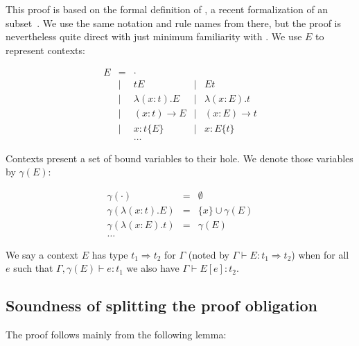 This proof is based on the formal definition of \emf, a recent formalization
of an \fstar{} subset~\cite{dm4free}.
We use the same notation and rule names from there, but the proof is
nevertheless quite direct with just minimum familiarity with \emf.
%
We use $E$ to represent \fstar contexts:

\[
\begin{array}{rclcl}
    E &=&    \cdot  & & \\
      & \mid & t E &                 \mid & E t \\
      & \mid & \lambda(x:t). E &     \mid & \lambda(x:E). t \\
      & \mid & (x:t) \rightarrow E & \mid & (x:E) \rightarrow t \\
      & \mid & x:t\{E\} &            \mid & x:E\{t\} \\
      & ~ & \ldots
\end{array}
\]

Contexts present a set of bound variables to their hole. We denote
those variables by $\gamma(E)$:

\[
\begin{array}{lcl}
    \gamma(\cdot) &=& \emptyset \\
    \gamma(\lambda(x:t). E) &=& \{x\} \cup \gamma(E) \\
    \gamma(\lambda(x:E). t) &=& \gamma(E) \\
    \ldots
\end{array}
\]

We say a context $E$ has type $t_1 \Rightarrow t_2$ for $\Gamma$ (noted
by $\Gamma \vdash E : t_1 \Rightarrow t_2$) when for all $e$ such that
$\Gamma, \gamma(E) \vdash e : t_1$ we also have $\Gamma \vdash E[e] : t_2$.

\subsection{Soundness of splitting the proof obligation}

The proof follows mainly from the following lemma:

